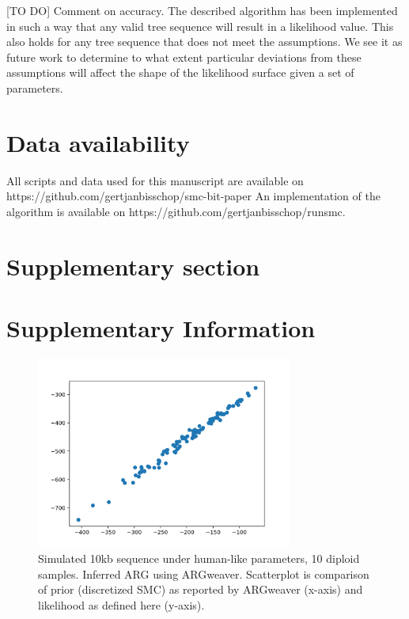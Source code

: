 \documentclass{article}
\newcommand{\supplementarysection}{%
  \setcounter{figure}{0}%
  \let\oldthefigure\thefigure%
  \renewcommand{\thefigure}{S\oldthefigure}%
  \section{Supplementary section}%
}
\begin{document}
[TO DO] Comment on accuracy. The described algorithm has been implemented in such a way that 
any valid tree sequence will result in a likelihood value. This also holds for any tree sequence 
that does not meet the assumptions. We see it as future work to determine to what extent 
particular deviations from these assumptions will affect the shape of the likelihood surface given 
a set of parameters.



\section{Data availability}

All scripts and data used for this manuscript are available on https://github.com/gertjanbisschop/smc-bit-paper
An implementation of the algorithm is available on https://github.com/gertjanbisschop/runsmc.
\FloatBarrier



\pagebreak 

\supplementarysection
\section*{Supplementary Information}


\begin{figure}[!ht]
\centering
\includegraphics[width=0.75\textwidth]{figures/supplementary-figs/argweaver_vs_runsmc.png}
\caption{Simulated 10kb sequence under human-like parameters, 10 diploid samples. Inferred ARG using ARGweaver. Scatterplot is comparison of prior (discretized SMC) as reported by ARGweaver (x-axis) and likelihood as defined here (y-axis).}
 \label{sup:fig:vs-argweaver}
\end{figure}
\end{document}
